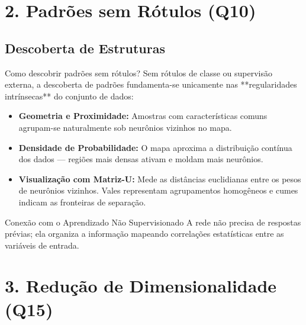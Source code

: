 \documentclass[aspectratio=169]{beamer}
\begin{document}
	\section{2. Padrões sem Rótulos (Q10)}
	
	\subsection{Descoberta de Estruturas}
	\begin{frame}{Como descobrir padrões sem rótulos?}
		Sem rótulos de classe ou supervisão externa, a descoberta de padrões fundamenta-se unicamente nas **regularidades intrínsecas** do conjunto de dados:
		
		\begin{itemize}
			\item \textbf{Geometria e Proximidade:} Amostras com características comuns agrupam-se naturalmente sob neurônios vizinhos no mapa.
			\item \textbf{Densidade de Probabilidade:} O mapa aproxima a distribuição contínua dos dados — regiões mais densas ativam e moldam mais neurônios.
			\item \textbf{Visualização com Matriz-U:} Mede as distâncias euclidianas entre os pesos de neurônios vizinhos. Vales representam agrupamentos homogêneos e cumes indicam as fronteiras de separação.
		\end{itemize}
		
		\begin{block}{Conexão com o Aprendizado Não Supervisionado}
			A rede não precisa de respostas prévias; ela organiza a informação mapeando correlações estatísticas entre as variáveis de entrada.
		\end{block}
	\end{frame}
	
	\section{3. Redução de Dimensionalidade (Q15)}
	
\end{document}
